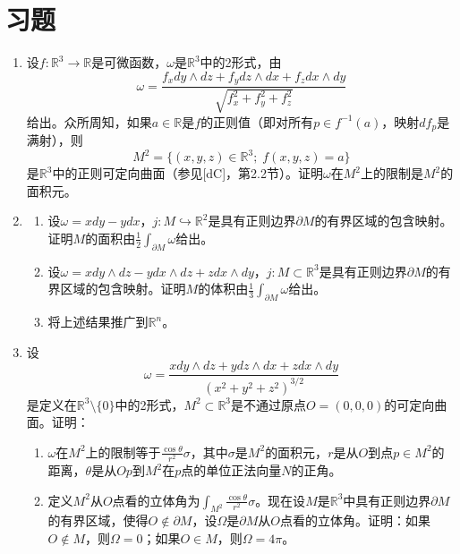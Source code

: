 \documentclass[12pt,a4paper]{ctexbook}
\begin{document}
\section*{习题}
\begin{enumerate}
    \item 设$f:\mathbb{R}^3\to\mathbb{R}$是可微函数，$\omega$是$\mathbb{R}^3$中的2形式，由
    $$\omega = \frac{f_x dy\wedge dz + f_y dz\wedge dx + f_z dx\wedge dy}{\sqrt{f_x^2 + f_y^2 + f_z^2}}$$
    给出。众所周知，如果$a\in\mathbb{R}$是$f$的正则值（即对所有$p\in f^{-1}(a)$，映射$df_p$是满射），则
    $$M^2 = \{(x,y,z)\in\mathbb{R}^3;\; f(x,y,z) = a\}$$
    是$\mathbb{R}^3$中的正则可定向曲面（参见[dC]，第2.2节）。证明$\omega$在$M^2$上的限制是$M^2$的面积元。
    
    \item 
    \begin{enumerate}[label=\alph*)]
        \item 设$\omega = xdy - ydx$，$j:M\hookrightarrow\mathbb{R}^2$是具有正则边界$\partial M$的有界区域的包含映射。证明$M$的面积由$\frac{1}{2}\int_{\partial M} \omega$给出。
        
        \item 设$\omega = xdy\wedge dz - ydx\wedge dz + zdx\wedge dy$，$j:M\subset\mathbb{R}^3$是具有正则边界$\partial M$的有界区域的包含映射。证明$M$的体积由$\frac{1}{3}\int_{\partial M} \omega$给出。
        
        \item 将上述结果推广到$\mathbb{R}^n$。
    \end{enumerate}
    
    \item 设
    $$\omega = \frac{xdy\wedge dz + ydz\wedge dx + zdx\wedge dy}{(x^2+y^2+z^2)^{3/2}}$$
    是定义在$\mathbb{R}^3\setminus\{0\}$中的2形式，$M^2\subset\mathbb{R}^3$是不通过原点$O=(0,0,0)$的可定向曲面。证明：
    \begin{enumerate}[label=\alph*)]
        \item $\omega$在$M^2$上的限制等于$\frac{\cos\theta}{r^2}\sigma$，其中$\sigma$是$M^2$的面积元，$r$是从$O$到点$p\in M^2$的距离，$\theta$是从$Op$到$M^2$在$p$点的单位正法向量$N$的正角。
        
        \item 定义$M^2$从$O$点看的立体角为$\int_{M^2} \frac{\cos\theta}{r^2}\sigma$。现在设$M$是$\mathbb{R}^3$中具有正则边界$\partial M$的有界区域，使得$O\notin\partial M$，设$\Omega$是$\partial M$从$O$点看的立体角。证明：如果$O\notin M$，则$\Omega=0$；如果$O\in M$，则$\Omega=4\pi$。
    \end{enumerate}
    

\end{enumerate}
\end{document}
